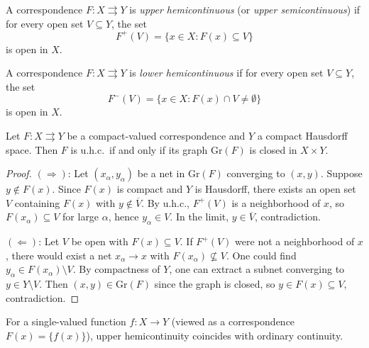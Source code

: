 \begin{definition}
A correspondence $F\colon X \rightrightarrows Y$ is \emph{upper hemicontinuous} (or
\emph{upper semicontinuous}) if for every open set $V \subseteq Y$, the set
\[
  F^+(V) = \{x \in X : F(x) \subseteq V\}
\]
is open in $X$.
\end{definition}

\begin{definition}
A correspondence $F\colon X \rightrightarrows Y$ is \emph{lower hemicontinuous} if for
every open set $V \subseteq Y$, the set
\[
  F^-(V) = \{x \in X : F(x) \cap V \neq \emptyset\}
\]
is open in $X$.
\end{definition}

\begin{proposition}
\label{prop:closed-graph}
Let $F\colon X \rightrightarrows Y$ be a compact-valued correspondence and $Y$ a compact
Hausdorff space. Then $F$ is u.h.c.\ if and only if its graph $\mathrm{Gr}(F)$ is closed
in $X \times Y$.
\end{proposition}

\begin{proof}
$(\Rightarrow)$: Let $(x_\alpha, y_\alpha)$ be a net in $\mathrm{Gr}(F)$ converging to
$(x, y)$. Suppose $y \notin F(x)$. Since $F(x)$ is compact and $Y$ is Hausdorff, there
exists an open set $V$ containing $F(x)$ with $y \notin \overline{V}$. By u.h.c.,
$F^+(V)$ is a neighborhood of $x$, so $F(x_\alpha) \subseteq V$ for large $\alpha$,
hence $y_\alpha \in V$. In the limit, $y \in \overline{V}$, contradiction.

$(\Leftarrow)$: Let $V$ be open with $F(x) \subseteq V$. If $F^+(V)$ were not a
neighborhood of $x$, there would exist a net $x_\alpha \to x$ with
$F(x_\alpha) \not\subseteq V$. One could find $y_\alpha \in F(x_\alpha) \setminus V$.
By compactness of $Y$, one can extract a subnet converging to $y \in Y \setminus V$.
Then $(x,y) \in \mathrm{Gr}(F)$ since the graph is closed, so $y \in F(x) \subseteq V$,
contradiction.
\end{proof}

\begin{remark}
For a single-valued function $f\colon X \to Y$ (viewed as a correspondence
$F(x) = \{f(x)\}$), upper hemicontinuity coincides with ordinary continuity.
\end{remark}

